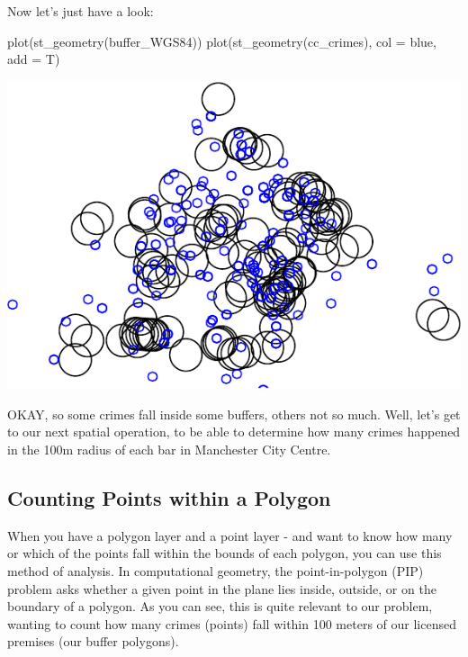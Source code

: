 \documentclass[
]{book}
\newenvironment{Shaded}{\begin{snugshade}}{\end{snugshade}}
\newcommand{\AttributeTok}[1]{\textcolor[rgb]{0.77,0.63,0.00}{#1}}
\newcommand{\FunctionTok}[1]{\textcolor[rgb]{0.00,0.00,0.00}{#1}}
\newcommand{\NormalTok}[1]{#1}
\newcommand{\StringTok}[1]{\textcolor[rgb]{0.31,0.60,0.02}{#1}}
\begin{document}
Now let's just have a look:

\begin{Shaded}
\begin{Highlighting}[]
\FunctionTok{plot}\NormalTok{(}\FunctionTok{st\_geometry}\NormalTok{(buffer\_WGS84))}
\FunctionTok{plot}\NormalTok{(}\FunctionTok{st\_geometry}\NormalTok{(cc\_crimes), }\AttributeTok{col =} \StringTok{\textquotesingle{}blue\textquotesingle{}}\NormalTok{, }\AttributeTok{add =}\NormalTok{ T)}
\end{Highlighting}
\end{Shaded}

\includegraphics{crime_mapping_files/figure-latex/crimes_and_buffers-1.pdf}

OKAY, so some crimes fall inside some buffers, others not so much. Well, let's get to our next spatial operation, to be able to determine how many crimes happened in the 100m radius of each bar in Manchester City Centre.

\hypertarget{counting-points-within-a-polygon}{%
\subsection{Counting Points within a Polygon}\label{counting-points-within-a-polygon}}

When you have a polygon layer and a point layer - and want to know how many or which of the points fall within the bounds of each polygon, you can use this method of analysis. In computational geometry, the point-in-polygon (PIP) problem asks whether a given point in the plane lies inside, outside, or on the boundary of a polygon. As you can see, this is quite relevant to our problem, wanting to count how many crimes (points) fall within 100 meters of our licensed premises (our buffer polygons).
\end{document}

